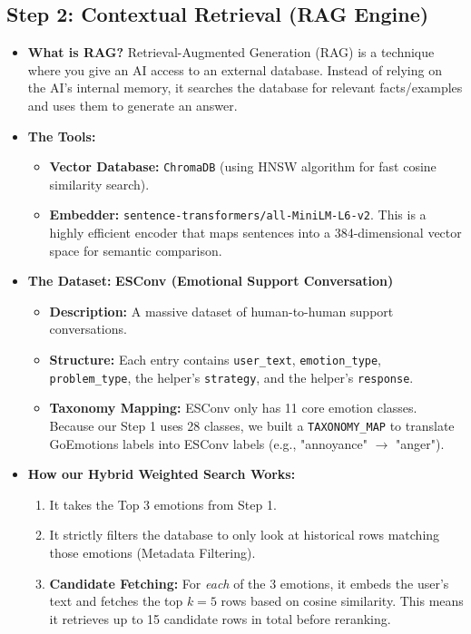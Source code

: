 \documentclass[12pt,a4paper]{article}
\begin{document}
\subsection{Step 2: Contextual Retrieval (RAG Engine)}
\begin{itemize}
    \item \textbf{What is RAG?} Retrieval-Augmented Generation (RAG) is a technique where you give an AI access to an external database. Instead of relying on the AI's internal memory, it searches the database for relevant facts/examples and uses them to generate an answer.
    \item \textbf{The Tools:} 
    \begin{itemize}
        \item \textbf{Vector Database:} \texttt{ChromaDB} (using HNSW algorithm for fast cosine similarity search).
        \item \textbf{Embedder:} \texttt{sentence-transformers/all-MiniLM-L6-v2}. This is a highly efficient encoder that maps sentences into a 384-dimensional vector space for semantic comparison.
    \end{itemize}
    \item \textbf{The Dataset:} \textbf{ESConv (Emotional Support Conversation)}
    \begin{itemize}
        \item \textbf{Description:} A massive dataset of human-to-human support conversations.
        \item \textbf{Structure:} Each entry contains \texttt{user\_text}, \texttt{emotion\_type}, \texttt{problem\_type}, the helper's \texttt{strategy}, and the helper's \texttt{response}.
        \item \textbf{Taxonomy Mapping:} ESConv only has 11 core emotion classes. Because our Step 1 uses 28 classes, we built a \texttt{TAXONOMY\_MAP} to translate GoEmotions labels into ESConv labels (e.g., "annoyance" $\rightarrow$ "anger").
    \end{itemize}
    \item \textbf{How our Hybrid Weighted Search Works:}
    \begin{enumerate}
        \item It takes the Top 3 emotions from Step 1.
        \item It strictly filters the database to only look at historical rows matching those emotions (Metadata Filtering).
        \item \textbf{Candidate Fetching:} For \textit{each} of the 3 emotions, it embeds the user's text and fetches the top $k=5$ rows based on cosine similarity. This means it retrieves up to 15 candidate rows in total before reranking.

\end{enumerate}
\end{itemize}
\end{document}
